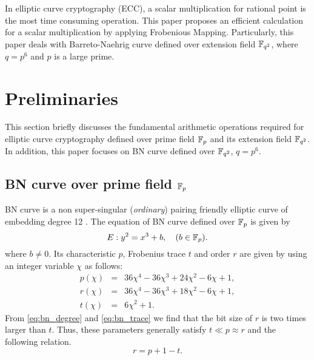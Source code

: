 
In elliptic curve cryptography (ECC), a scalar multiplication for rational point is the most time consuming operation. This paper proposes an efficient calculation for a scalar multiplication by applying Frobenious Mapping. Particularly, this paper deals with  Barreto-Naehrig curve defined over extension field ${\mathbb{F}}_{q^{2}}$, where $q=p^6$ and $p$ is a large prime.



\section{Preliminaries}
This section briefly discusses the fundamental arithmetic operations required for elliptic curve cryptography defined over prime field ${\mathbb{F}}_{p}$ and its extension field ${\mathbb{F}}_{q^{2}}$. In addition, this paper focuses on BN curve defined over ${\mathbb{F}}_{q^{2}}$, $q=p^6$.

\subsection{BN curve over prime field ${\mathbb{F}}_{p}$}
BN curve is a non\- super-singular (\textit{ordinary}) pairing friendly 
elliptic curve of embedding degree 12 \cite{EPRINT:FreScoTes06}. The equation of BN curve defined over ${\mathbb{F}}_{p}$ is given by 
\begin{equation}\label{eq:(BN_curve)}
E:y^2=x^3+b, \quad \mbox{($b \in {\mathbb{F}}_{p}$)}.
\end{equation}
where $b \neq 0$. Its characteristic $p$, Frobenius trace $t$ and order $r$ are given by using an integer variable $\chi$ as follows:
\begin{eqnarray}
p(\chi) & = & 36\chi^4-36\chi^3+24\chi^2-6\chi+1, \\
r(\chi) & = & 36\chi^4-36\chi^3+18\chi^2-6\chi+1,\label{eq:bn_degree}  \\
t(\chi) & = & 6\chi^2+1.\label{eq:bn_trace} 
\end{eqnarray} 
From \eqref{eq:bn_degree} and \eqref{eq:bn_trace} we find that the bit size of $r$ is two times larger than $t$. Thus, these parameters generally satisfy $t \ll p \approx r$ and the following relation.
\begin{equation}\label{eq:rpt_relation}
r = p+1-t.
\end{equation}

